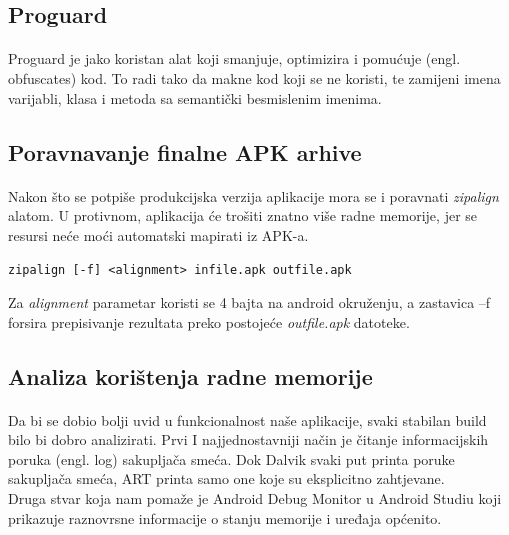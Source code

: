 \documentclass[times, utf8, zavrsni]{fer}
\begin{document}
\subsection{Proguard}
\paragraph{}
Proguard je jako koristan alat koji smanjuje, optimizira i pomućuje (engl. obfuscates) kod. To radi tako da makne kod koji se ne koristi, te zamijeni imena varijabli, klasa i metoda sa semantički besmislenim imenima. 

\subsection{Poravnavanje finalne APK arhive}
\paragraph{}
Nakon što se potpiše produkcijska verzija aplikacije mora se i poravnati \textit{zipalign} alatom. U protivnom, aplikacija će trošiti znatno više radne memorije, jer se resursi neće moći automatski mapirati iz APK-a.

\begin{center}
\verb|zipalign [-f] <alignment> infile.apk outfile.apk|
\end{center}

Za \textit{alignment} parametar koristi se 4 bajta na android okruženju, a zastavica –f forsira prepisivanje rezultata preko postojeće \textit{outfile.apk} datoteke.

\subsection{Analiza korištenja radne memorije}
\paragraph{}
Da bi se dobio bolji uvid u funkcionalnost naše aplikacije, svaki stabilan build bilo bi dobro analizirati.
Prvi I najjednostavniji način je čitanje informacijskih poruka (engl. log) sakupljača smeća. Dok Dalvik svaki put printa poruke sakupljača smeća, ART printa samo one koje su eksplicitno zahtjevane.\\

Druga stvar koja nam pomaže je Android Debug Monitor u Android Studiu koji prikazuje raznovrsne informacije o stanju memorije i uređaja općenito.\\
\end{document}
